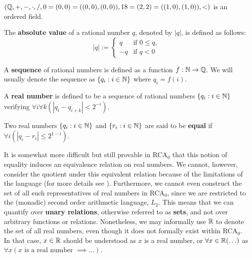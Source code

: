 \documentclass[../main.tex]{memoir}
\begin{document}
\begin{theorem}
  $(\mathbb{Q}, +, -, \cdot, /, 0 = (0, 0) = ((0, 0), (0, 0)), 18 = (2, 2) = ((1, 0), (1, 0)), <)$ is an ordered field.
\end{theorem}

\begin{definition}
  The \textbf{absolute value} of a rational number $q$, denoted by $|q|$, is defined as follows:
  \begin{equation*}
    |q| := \left\{
    \begin{array}{lr}
      q & \text{if } 0 \le q \text{,} \\
      -q & \text{if } q < 0
    \end{array}
    \right.
  \end{equation*}
\end{definition}

\begin{definition}
  A \textbf{sequence} of rational numbers is defined as a function $f: \mathbb{N} \to \mathbb{Q}$. We will usually denote the sequence as $\{q_i: i \in \mathbb{N}\}$ where $q_i = f(i)$.
\end{definition}

\begin{definition}
  A \textbf{real number} is defined to be a sequence of rational numbers $\{q_i: i \in \mathbb{N}\}$ verifying $\forall i \forall k (|q_i - q_{i + k}| < 2^{-i})$.
\end{definition}

\begin{definition}
  Two real numbers $\{q_i: i \in \mathbb{N}\}$ and $\{r_i: i \in \mathbb{N}\}$ are said to be \textbf{equal} if $\forall i (|q_i - r_i| \le 2^{1 - i})$.
\end{definition}

It is somewhat more difficult but still provable in RCA$_0$ that this notion of equality induces an equivalence relation on real numbers. We cannot, however, consider the quotient under this equivalent relation because of the limitations of the language (for more details see \cite{simpson}). Furthermore, we cannot even construct the set of all such representatives of real numbers in RCA$_0$, since we are restricted to the (monadic) second order arithmetic language, $L_2$. This means that we can quantify over \textbf{unary relations}, otherwise referred to as \textbf{sets}, and not over arbitrary functions or relations. Nonetheless, we may informally use $\mathbb{R}$ to denote the set of all real numbers, even though it does not formally exist within RCA$_0$. In that case, $x \in \mathbb{R}$ should be understood as $x$ is a real number, or $\forall x \in \mathbb{R} (\ldots)$ as $\forall x (x \text{ is a real number } \implies \ldots)$. \\
\end{document}

